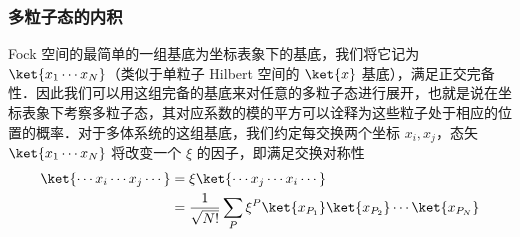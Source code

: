 \subsubsection{多粒子态的内积}
Fock 空间的最简单的一组基底为坐标表象下的基底，我们将它记为 $\ket{x_1\cdots x_N}$（类似于单粒子 Hilbert 空间的 $\ket{x}$ 基底），满足正交完备性．因此我们可以用这组完备的基底来对任意的多粒子态进行展开，也就是说在坐标表象下考察多粒子态，其对应系数的模的平方可以诠释为这些粒子处于相应的位置的概率．对于多体系统的这组基底，我们约定每交换两个坐标 $x_i,x_j$，态矢 $\ket{x_1\cdots x_N}$ 将改变一个 $\xi$ 的因子，即满足交换对称性
\begin{equation}
\begin{aligned}
\ket{\cdots x_i \cdots x_j \cdots}& =
\xi \ket{\cdots x_j \cdots x_i \cdots} \\
&=\frac{1}{\sqrt{N!}}\sum_P \xi^P\ket{x_{P_1}}\ket{x_{P_2}}\cdots\ket{x_{P_N}}
\end{aligned}
\end{equation}

